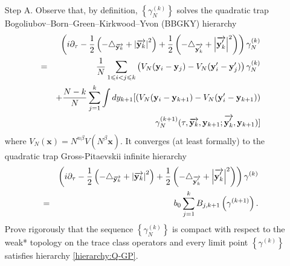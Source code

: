 \documentclass[reqno]{amsart}
\theoremstyle{plain}
\numberwithin{equation}{section}
\begin{document}
\begin{itemize}
\item[Step A.] Observe that, by definition, $\left\{ \gamma
_{N}^{(k)}\right\} $ solves the quadratic trap
Bogoliubov--Born--Green--Kirkwood--Yvon (BBGKY) hierarchy 
\begin{eqnarray}
&&\left( i\partial _{\tau }-\frac{1}{2}\left( -\triangle _{\overrightarrow{\mathbf{y}_{k}}}+\left\vert \overrightarrow{\mathbf{y}_{k}}\right\vert
^{2}\right) +\frac{1}{2}\left( -\triangle _{\overrightarrow{\mathbf{y}_{k}^{\prime }}}+\left\vert \overrightarrow{\mathbf{y}_{k}^{\prime }}\right\vert ^{2}\right) \right) \gamma _{N}^{(k)}  \label{hierarchy:BBGKY} \\
&=&\frac{1}{N}\sum_{1\leqslant i<j\leqslant k}\left( V_{N}(\mathbf{y}_{i}-\mathbf{y}_{j})-V_{N}(\mathbf{y}_{i}^{\prime }-\mathbf{y}_{j}^{\prime
})\right) \gamma _{N}^{(k)}  \notag \\
&&+\frac{N-k}{N}\sum_{j=1}^{k}\int dy_{k+1}[\left( V_{N}(\mathbf{y}_{i}-\mathbf{y}_{k+1})-V_{N}(\mathbf{y}_{i}^{\prime }-\mathbf{y}_{k+1})\right) 
\notag \\
&&\gamma _{N}^{(k+1)}(\tau ,\overrightarrow{\mathbf{y}_{k}},\mathbf{y}_{k+1};\overrightarrow{\mathbf{y}_{k}^{\prime }},\mathbf{y}_{k+1})]  \notag
\end{eqnarray}where $V_{N}(\mathbf{x})=N^{n\beta }V\left( N^{\beta }\mathbf{x}\right) $.
It converges (at least formally) to the quadratic trap Gross-Pitaevskii
infinite hierarchy\begin{eqnarray}
&&\left( i\partial _{\tau }-\frac{1}{2}\left( -\triangle _{\overrightarrow{\mathbf{y}_{k}}}+\left\vert \overrightarrow{\mathbf{y}_{k}}\right\vert
^{2}\right) +\frac{1}{2}\left( -\triangle _{\overrightarrow{\mathbf{y}_{k}^{\prime }}}+\left\vert \overrightarrow{\mathbf{y}_{k}^{\prime }}\right\vert ^{2}\right) \right) \gamma ^{(k)}  \label{hierarchy:Q-GP} \\
&=&b_{0}\sum_{j=1}^{k}B_{j,k+1}\left( \gamma ^{(k+1)}\right) .  \notag
\end{eqnarray}Prove rigorously that the sequence $\left\{ \gamma _{N}^{(k)}\right\} $ is
compact with respect to the weak* topology on the trace class operators and
every limit point $\left\{ \gamma ^{(k)}\right\} $ satisfies hierarchy \ref{hierarchy:Q-GP}.


\end{itemize}
\end{document}
